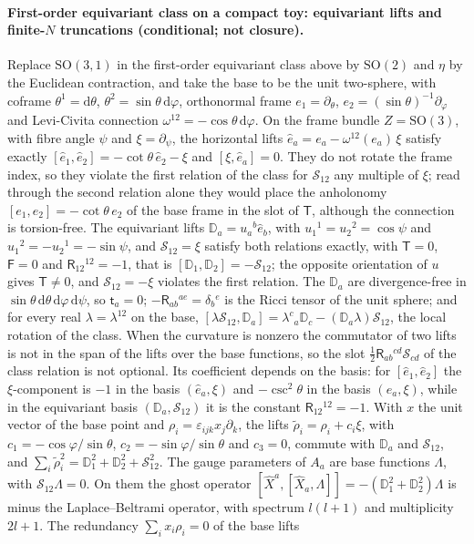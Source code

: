 \paragraph{First-order equivariant class on a compact toy: equivariant lifts and finite-\(N\) truncations (conditional; not closure).}
Replace \(\mathrm{SO}(3,1)\) in the first-order equivariant class above by \(\mathrm{SO}(2)\) and \(\eta\) by the Euclidean contraction, and take the base to be the unit two-sphere, with coframe \(\theta^1=\mathrm d\theta\), \(\theta^2=\sin\theta\,\mathrm d\varphi\), orthonormal frame \(e_1=\partial_\theta\), \(e_2=(\sin\theta)^{-1}\partial_\varphi\) and Levi-Civita connection \(\omega^{12}=-\cos\theta\,\mathrm d\varphi\). On the frame bundle \(Z=\mathrm{SO}(3)\), with fibre angle \(\psi\) and \(\xi=\partial_\psi\), the horizontal lifts \(\hat e_a=e_a-\omega^{12}(e_a)\,\xi\) satisfy exactly \([\hat e_1,\hat e_2]=-\cot\theta\,\hat e_2-\xi\) and \([\xi,\hat e_a]=0\). They do not rotate the frame index, so they violate the first relation of the class for \(\mathcal S_{12}\) any multiple of \(\xi\); read through the second relation alone they would place the anholonomy \([e_1,e_2]=-\cot\theta\,e_2\) of the base frame in the slot of \(\mathsf T\), although the connection is torsion-free. The equivariant lifts \(\mathbb D_a=u_a{}^b\hat e_b\), with \(u_1{}^1=u_2{}^2=\cos\psi\) and \(u_1{}^2=-u_2{}^1=-\sin\psi\), and \(\mathcal S_{12}=\xi\) satisfy both relations exactly, with \(\mathsf T=0\), \(\mathsf F=0\) and \(\mathsf R_{12}{}^{12}=-1\), that is \([\mathbb D_1,\mathbb D_2]=-\mathcal S_{12}\); the opposite orientation of \(u\) gives \(\mathsf T\neq0\), and \(\mathcal S_{12}=-\xi\) violates the first relation. The \(\mathbb D_a\) are divergence-free in \(\sin\theta\,\mathrm d\theta\,\mathrm d\varphi\,\mathrm d\psi\), so \(\mathsf t_a=0\); \(-\mathsf R_{ab}{}^{ae}=\delta_b{}^e\) is the Ricci tensor of the unit sphere; and for every real \(\lambda=\lambda^{12}\) on the base, \([\lambda\mathcal S_{12},\mathbb D_a]=\lambda^c{}_a\mathbb D_c-(\mathbb D_a\lambda)\mathcal S_{12}\), the local rotation of the class. When the curvature is nonzero the commutator of two lifts is not in the span of the lifts over the base functions, so the slot \(\tfrac12\mathsf R_{ab}{}^{cd}\mathcal S_{cd}\) of the class relation is not optional. Its coefficient depends on the basis: for \([\hat e_1,\hat e_2]\) the \(\xi\)-component is \(-1\) in the basis \((\hat e_a,\xi)\) and \(-\csc^2\theta\) in the basis \((e_a,\xi)\), while in the equivariant basis \((\mathbb D_a,\mathcal S_{12})\) it is the constant \(\mathsf R_{12}{}^{12}=-1\). With \(x\) the unit vector of the base point and \(\rho_i=\varepsilon_{ijk}x_j\partial_k\), the lifts \(\tilde\rho_i=\rho_i+c_i\xi\), with \(c_1=-\cos\varphi/\sin\theta\), \(c_2=-\sin\varphi/\sin\theta\) and \(c_3=0\), commute with \(\mathbb D_a\) and \(\mathcal S_{12}\), and \(\sum_i\tilde\rho_i^2=\mathbb D_1^2+\mathbb D_2^2+\mathcal S_{12}^2\). The gauge parameters of \(A_a\) are base functions \(\Lambda\), with \(\mathcal S_{12}\Lambda=0\). On them the ghost operator \([\hat X^a,[\hat X_a,\Lambda]]=-(\mathbb D_1^2+\mathbb D_2^2)\Lambda\) is minus the Laplace--Beltrami operator, with spectrum \(l(l+1)\) and multiplicity \(2l+1\). The redundancy \(\sum_ix_i\rho_i=0\) of the base lifts 